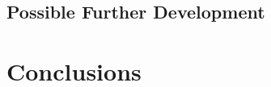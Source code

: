 \documentclass[12pt]{article}
\begin{document}

\subsection{Possible Further Development} %
\label{sub:possible_further_development}




\section{Conclusions} %
\label{sec:conclusions}

\end{document}

